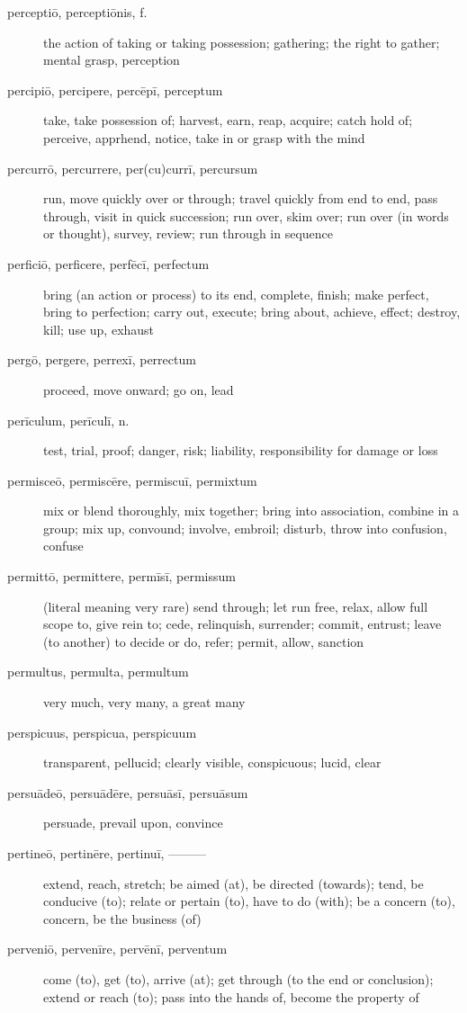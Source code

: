 \begin{description}
    \item[perceptiō, perceptiōnis, f.] the action of taking or taking possession; gathering; the right to gather; mental grasp, perception
    \item[percipiō, percipere, percēpī, perceptum] take, take possession of; harvest, earn, reap, acquire; catch hold of; perceive, apprhend, notice, take in or grasp with the mind
    \item[percurrō, percurrere, per(cu)currī, percursum] run, move quickly over or through; travel quickly from end to end, pass through, visit in quick succession; run over, skim over; run over (in words or thought), survey, review; run through in sequence
    \item[perficiō, perficere, perfēcī, perfectum] bring (an action or process) to its end, complete, finish; make perfect, bring to perfection; carry out, execute; bring about, achieve, effect; destroy, kill; use up, exhaust
    \item[pergō, pergere, perrexī, perrectum] proceed, move onward; go on, lead
    \item[perīculum, perīculī, n.] test, trial, proof; danger, risk; liability, responsibility for damage or loss
    \item[permisceō, permiscēre, permiscuī, permixtum] mix or blend thoroughly, mix together; bring into association, combine in a group; mix up, convound; involve, embroil; disturb, throw into confusion, confuse
    \item[permittō, permittere, permīsī, permissum] (literal meaning very rare) send through; let run free, relax, allow full scope to, give rein to; cede, relinquish, surrender; commit, entrust; leave (to another) to decide or do, refer; permit, allow, sanction
    \item[permultus, permulta, permultum] very much, very many, a great many
    \item[perspicuus, perspicua, perspicuum] transparent, pellucid; clearly visible, conspicuous; lucid, clear
    \item[persuādeō, persuādēre, persuāsī, persuāsum] persuade, prevail upon, convince
    \item[pertineō, pertinēre, pertinuī, ———] extend, reach, stretch; be aimed (at), be directed (towards); tend, be conducive (to); relate or pertain (to), have to do (with); be a concern (to), concern, be the business (of)
    \item[perveniō, pervenīre, pervēnī, perventum] come (to), get (to), arrive (at); get through (to the end or conclusion); extend or reach (to); pass into the hands of, become the property of

\end{description}
